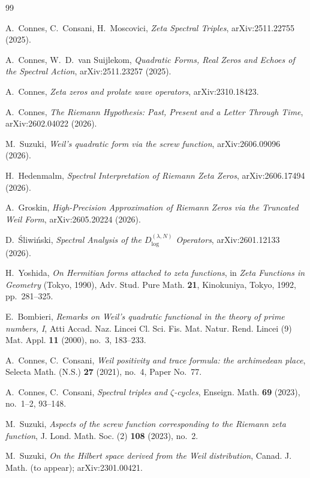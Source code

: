 \documentclass[11pt,a4paper]{article}
\begin{document}
\begin{thebibliography}{99}

A.~Connes, C.~Consani, H.~Moscovici,
\emph{Zeta Spectral Triples}, arXiv:2511.22755 (2025).

A.~Connes, W.~D.~van Suijlekom,
\emph{Quadratic Forms, Real Zeros and Echoes of the Spectral Action},
arXiv:2511.23257 (2025).

A.~Connes,
\emph{Zeta zeros and prolate wave operators}, arXiv:2310.18423.

A.~Connes,
\emph{The Riemann Hypothesis: Past, Present and a Letter Through Time},
arXiv:2602.04022 (2026).

M.~Suzuki,
\emph{Weil's quadratic form via the screw function}, arXiv:2606.09096 (2026).

H.~Hedenmalm,
\emph{Spectral Interpretation of Riemann Zeta Zeros}, arXiv:2606.17494 (2026).

A.~Groskin,
\emph{High-Precision Approximation of Riemann Zeros via the Truncated Weil
Form}, arXiv:2605.20224 (2026).

D.~\'Sliwi\'nski,
\emph{Spectral Analysis of the $D_{\log}^{(\lambda,N)}$ Operators},
arXiv:2601.12133 (2026).

H.~Yoshida,
\emph{On Hermitian forms attached to zeta functions}, in \emph{Zeta Functions
in Geometry} (Tokyo, 1990), Adv. Stud. Pure Math. \textbf{21}, Kinokuniya,
Tokyo, 1992, pp.~281--325.

E.~Bombieri,
\emph{Remarks on Weil's quadratic functional in the theory of prime numbers, I},
Atti Accad. Naz. Lincei Cl. Sci. Fis. Mat. Natur. Rend. Lincei (9) Mat. Appl.
\textbf{11} (2000), no.~3, 183--233.

A.~Connes, C.~Consani,
\emph{Weil positivity and trace formula: the archimedean place},
Selecta Math. (N.S.) \textbf{27} (2021), no.~4, Paper No.~77.

A.~Connes, C.~Consani,
\emph{Spectral triples and $\zeta$-cycles},
Enseign. Math. \textbf{69} (2023), no.~1--2, 93--148.

M.~Suzuki,
\emph{Aspects of the screw function corresponding to the Riemann zeta function},
J. Lond. Math. Soc. (2) \textbf{108} (2023), no.~2.

M.~Suzuki,
\emph{On the Hilbert space derived from the Weil distribution},
Canad. J. Math. (to appear); arXiv:2301.00421.


\end{thebibliography}
\end{document}
